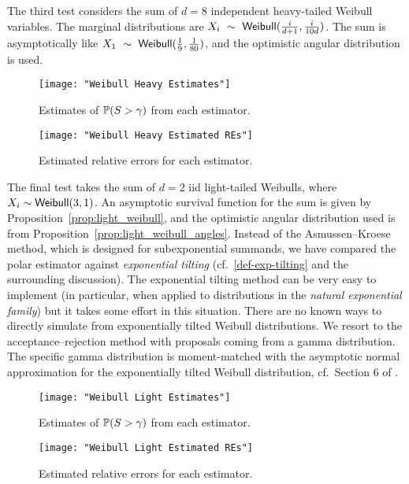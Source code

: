 The third test considers the sum of $d=8$ independent heavy-tailed Weibull variables. The marginal distributions are $X_i~\sim~\mathsf{Weibull}(\frac{i}{d+1}, \frac{i}{10d})$. The sum is asymptotically like $X_1~\sim~\mathsf{Weibull}(\frac{1}{9}, \frac{1}{80})$, and the optimistic angular distribution is used.
\begin{figure}[H]
	\centering
	\texttt{[image: "Weibull Heavy Estimates"]}
	\caption{Estimates of $\operatorname{{\mathbb P}}(S > \gamma)$ from each estimator.}
\end{figure}

\begin{figure}[H]
	\centering
	\texttt{[image: "Weibull Heavy Estimated REs"]}
	\caption{Estimated relative errors for each estimator.}
\end{figure}

The final test takes the sum of $d=2$ iid light-tailed Weibulls, where $X_i \sim \mathsf{Weibull}(3, 1)$. An asymptotic survival function for the sum is given by Proposition~\ref{prop:light_weibull}, and the optimistic angular distribution used is from Proposition~\ref{prop:light_weibull_angles}. Instead of the Asmussen--Kroese method, which is designed for subexponential summands, we have compared the polar estimator against \emph{exponential tilting} (cf.\ \eqref{def-exp-tilting} and the surrounding discussion). The exponential tilting method can be very easy to implement (in particular, when applied to distributions in the \emph{natural exponential family}) but it takes some effort in this situation. There are no known ways to directly simulate from exponentially tilted Weibull distributions. We resort to the acceptance--rejection method with proposals coming from a gamma distribution. The specific gamma distribution is moment-matched with the asymptotic normal approximation for the exponentially tilted Weibull distribution, cf.\ Section 6 of \cite{asmussen2017tail}.

\begin{figure}[H]
	\centering
	\texttt{[image: "Weibull Light Estimates"]}
	\caption{Estimates of $\operatorname{{\mathbb P}}(S > \gamma)$ from each estimator.}
\end{figure}

\begin{figure}[H]
	\centering
	\texttt{[image: "Weibull Light Estimated REs"]}
	\caption{Estimated relative errors for each estimator.}
\end{figure}



